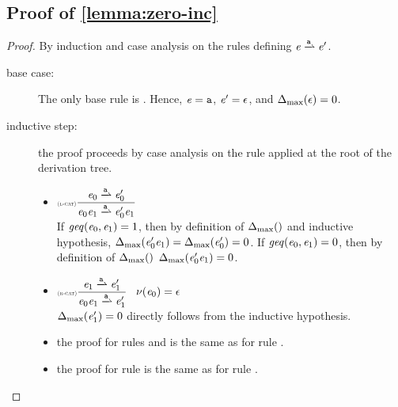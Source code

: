 \subsection*{Proof of \cref{lemma:zero-inc}}
\begin{proof}
 By induction and case analysis on the rules defining $\re\parDer{\sym}\re'$.
 \begin{description}
  \item[base case:] The only base rule is .
   Hence, $\mathit {e}=\mathtt {a}$, $\mathit {e}'=\mathtt {\epsilon}$, and
   ${\Delta_{\max}}({\mathtt {\epsilon}})=0$.
  \item[inductive step:] the proof proceeds by case analysis on the rule applied
   at the root of the derivation tree.
   \begin{itemize}
    \item $\Rule{l-cat}{\re_0\parDer{\sym}\re'_0}{\re_0\catop\re_1\parDer{\sym}\re'_0\catop\re_1}{}$\\[2ex]
          If $\mathit{geq}({\mathit {e}_0},{\mathit {e}_1})=1$, then by definition of ${\Delta_{\max}}({})$ and inductive hypothesis, ${\Delta_{\max}}({\mathit {e}'_0\mathit {e}_1})={\Delta_{\max}}({\mathit {e}'_0})=0$.
          If $\mathit{geq}({\mathit {e}_0},{\mathit {e}_1})=0$, then by definition of ${\Delta_{\max}}({})$ ${\Delta_{\max}}({\mathit {e}'_0\mathit {e}_1})=0$.

    \item $\Rule{r-cat}{\re_1\parDer{\sym}\re'_1}{\re_0\catop\re_1\parDer{\sym}\re'_1}{\hasEps{\re_0}=\eps}$\\[2ex]
          ${\Delta_{\max}}({\mathit {e}'_1})=0$ directly follows from the inductive hypothesis.

    \item the proof for rules  and  is the same as for rule .

    \item the proof for rule  is the same as for rule .
   \end{itemize}
 \end{description}
\end{proof}

